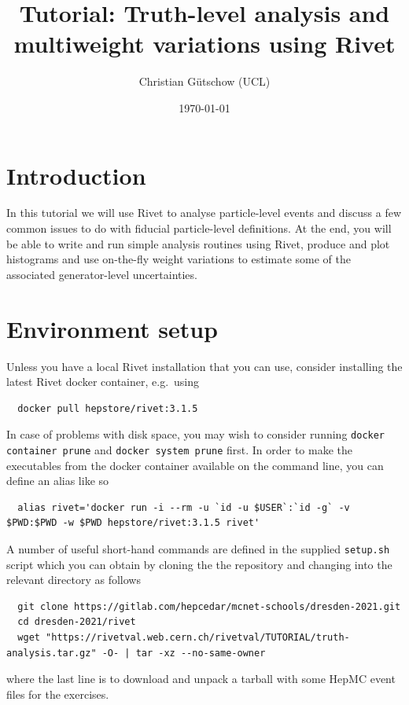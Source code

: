 \documentclass[10pt,fleqn]{scrartcl}
\theoremstyle{exstyle}
\begin{document}
\title{\vspace*{-2em} Tutorial: Truth-level analysis and multiweight variations using Rivet}
\author{Christian G\"{u}tschow (UCL)}
\date{\monthyeardate\today}
\maketitle

\section{Introduction}

In this tutorial we will use Rivet to analyse particle-level events 
and discuss a few common issues to do with fiducial particle-level definitions.
At the end, you will be able to write and run simple analysis routines using
Rivet, produce and plot histograms and use on-the-fly weight variations to
estimate some of the associated generator-level uncertainties.

\section{Environment setup}

Unless you have a local Rivet installation that you can use, consider installing the latest Rivet docker container, e.g.\ using
\begin{verbatim}
  docker pull hepstore/rivet:3.1.5
\end{verbatim}
In case of problems with disk space, you may wish to consider running
{\texttt{docker container prune}} and {\texttt{docker system prune}} first.
In order to make the executables from the docker container available on
the command line, you can define an alias like so
\begin{footnotesize}
\begin{verbatim}
  alias rivet='docker run -i --rm -u `id -u $USER`:`id -g` -v $PWD:$PWD -w $PWD hepstore/rivet:3.1.5 rivet'
\end{verbatim}
\end{footnotesize}
\noindent A number of useful short-hand commands are defined in the supplied \texttt{setup.sh} script
which you can obtain by cloning the the repository and changing into the relevant directory as follows
\begin{footnotesize}
\begin{verbatim}
  git clone https://gitlab.com/hepcedar/mcnet-schools/dresden-2021.git
  cd dresden-2021/rivet
  wget "https://rivetval.web.cern.ch/rivetval/TUTORIAL/truth-analysis.tar.gz" -O- | tar -xz --no-same-owner
\end{verbatim}
\end{footnotesize}
where the last line is to download and unpack a tarball with some HepMC event files for the exercises.
\end{document}
